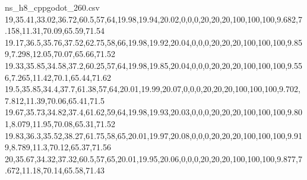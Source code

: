 \begin{filecontents*}[overwrite]{ns_h8_cppgodot_260.csv}
19,35.41,33.02,36.72,60.5,57,64,19.98,19.94,20.02,0,0,0,20,20,20,100,100,100,9.682,7.158,11.31,70.09,65.59,71.54
19.17,36.5,35.76,37.52,62.75,58,66,19.98,19.92,20.04,0,0,0,20,20,20,100,100,100,9.859,7.298,12.05,70.07,65.66,71.52
19.33,35.85,34.58,37.2,60.25,57,64,19.98,19.85,20.04,0,0,0,20,20,20,100,100,100,9.556,7.265,11.42,70.1,65.44,71.62
19.5,35.85,34.4,37.7,61.38,57,64,20.01,19.99,20.07,0,0,0,20,20,20,100,100,100,9.702,7.812,11.39,70.06,65.41,71.5
19.67,35.73,34.82,37.4,61.62,59,64,19.98,19.93,20.03,0,0,0,20,20,20,100,100,100,9.801,8.079,11.95,70.08,65.31,71.52
19.83,36.3,35.52,38.27,61.75,58,65,20.01,19.97,20.08,0,0,0,20,20,20,100,100,100,9.919,8.789,11.3,70.12,65.37,71.56
20,35.67,34.32,37.32,60.5,57,65,20.01,19.95,20.06,0,0,0,20,20,20,100,100,100,9.877,7.672,11.18,70.14,65.58,71.43
\end{filecontents*}

